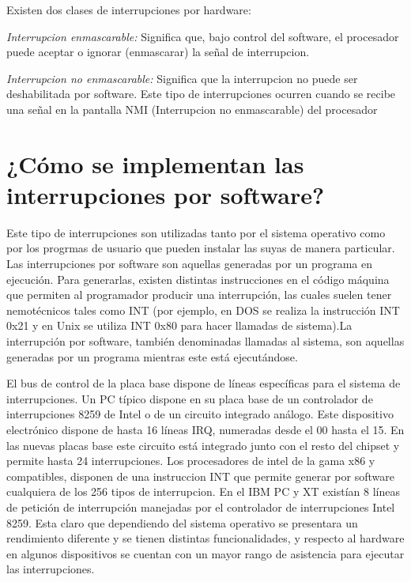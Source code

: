 \documentclass{article}
\begin{document}
Existen dos clases de interrupciones por hardware:
\par


{\em \large Interrupcion enmascarable:} Significa que, bajo control del software, el procesador puede aceptar o ignorar (enmascarar) la señal de interrupcion.

{\em \large Interrupcion no enmascarable:} Significa que la interrupcion no puede ser deshabilitada por software. Este tipo de interrupciones ocurren cuando se recibe una señal en la pantalla NMI (Interrupcion no enmascarable) del procesador

\section{¿Cómo se implementan las interrupciones por software?}
\par
Este tipo de interrupciones son utilizadas tanto por el sistema operativo como por los progrmas de usuario que pueden instalar las suyas de manera particular. Las interrupciones por software son aquellas generadas por un programa en ejecución. Para generarlas, existen distintas instrucciones en el código máquina que permiten al programador producir una interrupción, las cuales suelen tener nemotécnicos tales como INT (por ejemplo, en DOS se realiza la instrucción INT 0x21 y en Unix se utiliza INT 0x80 para hacer llamadas de sistema).La interrupción por software, también denominadas llamadas al sistema, son aquellas generadas por un programa mientras este está ejecutándose. 

\par
El bus de control de la placa base dispone de líneas específicas para el sistema de interrupciones. Un PC típico dispone en su placa base de un controlador de interrupciones 8259 de Intel o de un circuito integrado análogo. Este dispositivo electrónico dispone de hasta 16 líneas IRQ, numeradas desde el 00 hasta el 15. En las nuevas placas base este circuito está integrado junto con el resto del chipset y permite hasta 24 interrupciones. Los procesadores de intel de la gama x86 y compatibles, disponen de una instruccion INT que permite generar por software cualquiera de los 256 tipos de interrupcion. En el IBM PC y XT existían 8 líneas de petición de interrupción manejadas por el controlador de interrupciones Intel 8259. Esta claro que dependiendo del sistema operativo se presentara un rendimiento diferente y se tienen distintas funcionalidades, y respecto al hardware en algunos dispositivos se cuentan con un mayor rango de asistencia para ejecutar las interrupciones. 
\end{document}
